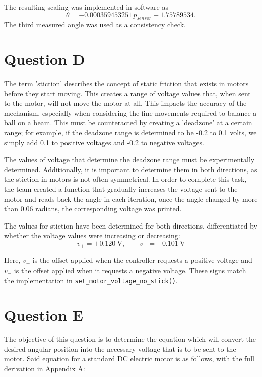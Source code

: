 \documentclass[11pt, letterpaper]{article}
\begin{document}
The resulting scaling was implemented in software as
\[
    \theta = -0.000359453251\,p_{sensor}+1.75789534.
\]
The third measured angle was used as a consistency check.

\section{Question D}
\label{sec:question_d}
The term 'stiction' describes the concept of static friction that exists in motors before
they start moving. This creates a range of voltage values that, when sent to the
motor, will not move the motor at all. This impacts the accuracy of the mechanism,
especially when considering the fine movements required to balance a ball on a beam.
This must be counteracted by creating a 'deadzone' at a certain range; for example,
if the deadzone range is determined to be -0.2 to 0.1 volts, we simply add 0.1 to positive voltages and -0.2 to negative voltages. \par
The values of voltage that determine the deadzone range must be experimentally determined.
Additionally, it is important to determine them in both directions, as the stiction in
motors is not often symmetrical. In order to complete this task, the team created a function that gradually increases the voltage sent to the motor and reads back the angle in each iteration, once the angle changed by more than 0.06 radians, the corresponding voltage was printed.
\par The values for stiction have been determined for both directions, differentiated by
whether the voltage values were increasing or decreasing:
\begin{equation}
    v_{+} = +0.120\ \mathrm{V}, \qquad v_{-} = -0.101\ \mathrm{V}
\end{equation}

Here, $v_{+}$ is the offset applied when the controller requests a positive
voltage and $v_{-}$ is the offset applied when it requests a negative voltage.
These signs match the implementation in
\texttt{set\_motor\_voltage\_no\_stick()}.

\section{Question E}
The objective of this question is to determine the equation which will convert the desired
angular position into the necessary voltage that is to be sent to the motor. Said equation
for a standard DC electric motor is as follows, with the full derivation in Appendix A:
\end{document}

